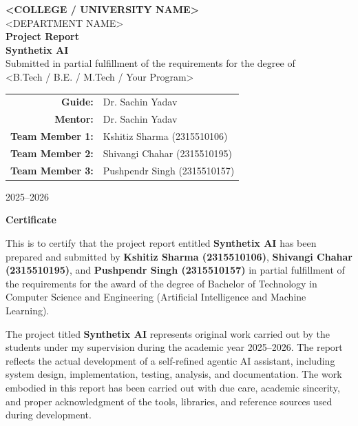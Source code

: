 \documentclass[11pt,oneside]{report}
\newcommand{\placeholder}[1]{\textless #1\textgreater}
\newcommand{\ProjectTitle}{Synthetix AI}
\newcommand{\InstitutionName}{\placeholder{COLLEGE / UNIVERSITY NAME}}
\newcommand{\DepartmentName}{\placeholder{DEPARTMENT NAME}}
\newcommand{\GuideName}{Dr. Sachin Yadav}
\newcommand{\AcademicYear}{2025--2026}
\newcommand{\TeamMemberOne}{Kshitiz Sharma (2315510106)}
\newcommand{\TeamMemberTwo}{Shivangi Chahar (2315510195)}
\newcommand{\TeamMemberThree}{Pushpendr Singh (2315510157)}
\begin{document}

\begin{titlepage}
\centering
\vspace*{1.2cm}
{\Large \textbf{\InstitutionName}\\[0.4cm]}
{\large \DepartmentName\\[1.2cm]}
{\Huge \textbf{Project Report}\\[0.4cm]}
{\LARGE \textbf{\ProjectTitle}\\[1.5cm]}
{\large Submitted in partial fulfillment of the requirements for the degree of\\[0.2cm]}
{\large \placeholder{B.Tech / B.E. / M.Tech / Your Program}\\[1.5cm]}
\begin{tabular}{rl}
\textbf{Guide:} & \GuideName \\
\textbf{Mentor:} & \GuideName \\
\textbf{Team Member 1:} & \TeamMemberOne \\
\textbf{Team Member 2:} & \TeamMemberTwo \\
\textbf{Team Member 3:} & \TeamMemberThree \\
\end{tabular}

\vfill
{\large \AcademicYear}
\end{titlepage}

\clearpage
\thispagestyle{empty}
\begin{center}
{\Large \textbf{Certificate}}\\[1.5cm]
\end{center}
This is to certify that the project report entitled \textbf{\ProjectTitle{}} has been prepared and submitted by \textbf{\TeamMemberOne{}}, \textbf{\TeamMemberTwo{}}, and \textbf{\TeamMemberThree{}} in partial fulfillment of the requirements for the award of the degree of Bachelor of Technology in Computer Science and Engineering (Artificial Intelligence and Machine Learning).

The project titled \textbf{\ProjectTitle{}} represents original work carried out by the students under my supervision during the academic year \AcademicYear{}. The report reflects the actual development of a self-refined agentic AI assistant, including system design, implementation, testing, analysis, and documentation. The work embodied in this report has been carried out with due care, academic sincerity, and proper acknowledgment of the tools, libraries, and reference sources used during development.
\end{document}

